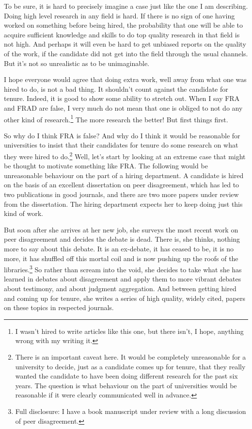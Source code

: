 \documentclass[
  11pt,
  letterpaper,
  DIV=11,
  numbers=noendperiod]{scrartcl}
\begin{document}
To be sure, it is hard to precisely imagine a case just like the one I
am describing. Doing high level research in any field is hard. If there
is no sign of one having worked on something before being hired, the
probability that one will be able to acquire sufficient knowledge and
skills to do top quality research in that field is not high. And perhaps
it will even be hard to get unbiased reports on the quality of the work,
if the candidate did not get into the field through the usual channels.
But it's not so unrealistic as to be unimaginable.

I hope everyone would agree that doing extra work, well away from what
one was hired to do, is not a bad thing. It shouldn't count against the
candidate for tenure. Indeed, it is good to show some ability to stretch
out. When I say FRA and FRAD are false, I very much do not mean that one
is obliged to not do any other kind of research.\footnote{I wasn't hired
  to write articles like this one, but there isn't, I hope, anything
  wrong with my writing it.} The more research the better! But first
things first.

So why do I think FRA is false? And why do I think it would be
reasonable for universities to insist that their candidates for tenure
do some research on what they were hired to do.\footnote{There is an
  important caveat here. It would be completely unreasonable for a
  university to decide, just as a candidate comes up for tenure, that
  they really wanted the candidate to have been doing different research
  for the past six years. The question is what behaviour on the part of
  universities would be reasonable if it were clearly communicated well
  in advance.} Well, let's start by looking at an extreme case that
might be thought to motivate something like FRA. The following would be
unreasonable behaviour on the part of a hiring department. A candidate
is hired on the basis of an excellent dissertation on peer disagreement,
which has led to two publications in good journals, and there are two
more papers under review from the dissertation. The hiring department
expects her to keep doing just this kind of work.

But soon after she arrives at her new job, she surveys the most recent
work on peer disagreement and decides the debate is dead. There is, she
thinks, nothing more to say about this debate. It is an ex-debate, it
has ceased to be, it is no more, it has shuffled off this mortal coil
and is now pushing up the roofs of the libraries.\footnote{Full
  disclosure: I have a book manuscript under review with a long
  discussion of peer disagreement.} So rather than scream into the void,
she decides to take what she has learned in debates about disagreement
and apply them to more vibrant debates about testimony, and about
judgment aggregation. And between getting hired and coming up for
tenure, she writes a series of high quality, widely cited, papers on
these topics in respected journals.
\end{document}
